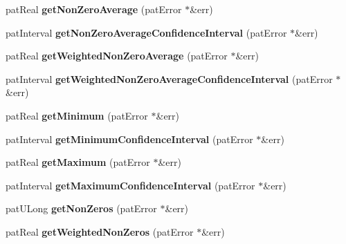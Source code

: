 \begin{DoxyCompactItemize}
pat\+Real {\bfseries get\+Non\+Zero\+Average} (pat\+Error $\ast$\&err)
\item 
\mbox{\label{classbio_simulated_values_aca151053bf7e4cecd32f9c070a2e0e5e}} 
pat\+Interval {\bfseries get\+Non\+Zero\+Average\+Confidence\+Interval} (pat\+Error $\ast$\&err)
\item 
\mbox{\label{classbio_simulated_values_af5f9bb4fb2299ebd3c7e9033bd5c9a1e}} 
pat\+Real {\bfseries get\+Weighted\+Non\+Zero\+Average} (pat\+Error $\ast$\&err)
\item 
\mbox{\label{classbio_simulated_values_a08ad928d5a8f19e75c86db70b073b166}} 
pat\+Interval {\bfseries get\+Weighted\+Non\+Zero\+Average\+Confidence\+Interval} (pat\+Error $\ast$\&err)
\item 
\mbox{\label{classbio_simulated_values_a7c1a21bb9c7ed51a68be9b26ae25bd1a}} 
pat\+Real {\bfseries get\+Minimum} (pat\+Error $\ast$\&err)
\item 
\mbox{\label{classbio_simulated_values_a98adfb98bdd0fd65aa6294a9dbf32ebc}} 
pat\+Interval {\bfseries get\+Minimum\+Confidence\+Interval} (pat\+Error $\ast$\&err)
\item 
\mbox{\label{classbio_simulated_values_a7fa4c3d93bb5bb9f06808f66e10a9a48}} 
pat\+Real {\bfseries get\+Maximum} (pat\+Error $\ast$\&err)
\item 
\mbox{\label{classbio_simulated_values_a6a26cf414d5f46b02cce79ad415ad371}} 
pat\+Interval {\bfseries get\+Maximum\+Confidence\+Interval} (pat\+Error $\ast$\&err)
\item 
\mbox{\label{classbio_simulated_values_a584414128be541697798db2207c85cdc}} 
pat\+U\+Long {\bfseries get\+Non\+Zeros} (pat\+Error $\ast$\&err)
\item 
\mbox{\label{classbio_simulated_values_a53afe1f5a194d5cd7c7bfccbd70ec7da}} 
pat\+Real {\bfseries get\+Weighted\+Non\+Zeros} (pat\+Error $\ast$\&err)
\item 
\mbox{\label{classbio_simulated_values_a37079dc94db0d5513513d9c89f3d03f2}} 

\end{DoxyCompactItemize}
